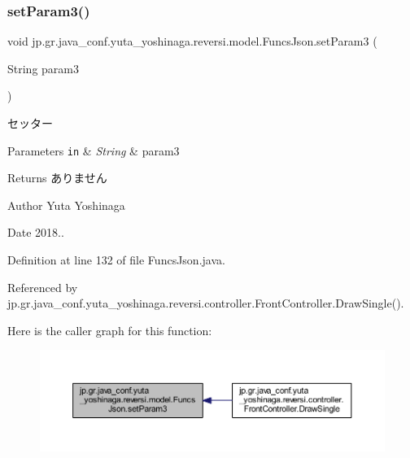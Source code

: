 \subsubsection{\texorpdfstring{set\+Param3()}{setParam3()}}
{\footnotesize\ttfamily void jp.\+gr.\+java\+\_\+conf.\+yuta\+\_\+yoshinaga.\+reversi.\+model.\+Funcs\+Json.\+set\+Param3 (\begin{DoxyParamCaption}\item[{String}]{param3 }\end{DoxyParamCaption})}



セッター 


\begin{DoxyParams}[1]{Parameters}
\mbox{\tt in}  & {\em String} & param3 \\
\hline
\end{DoxyParams}
\begin{DoxyReturn}{Returns}
ありません 
\end{DoxyReturn}
\begin{DoxyAuthor}{Author}
Yuta Yoshinaga 
\end{DoxyAuthor}
\begin{DoxyDate}{Date}
2018.. 
\end{DoxyDate}


Definition at line 132 of file Funcs\+Json.\+java.



Referenced by jp.\+gr.\+java\+\_\+conf.\+yuta\+\_\+yoshinaga.\+reversi.\+controller.\+Front\+Controller.\+Draw\+Single().

Here is the caller graph for this function\+:
\nopagebreak
\begin{figure}[H]
\begin{center}
\leavevmode
\includegraphics[width=350pt]{classjp_1_1gr_1_1java__conf_1_1yuta__yoshinaga_1_1reversi_1_1model_1_1_funcs_json_a27bc732004c573269cb63e71c1d1abcc_icgraph}
\end{center}
\end{figure}
\mbox{\label{classjp_1_1gr_1_1java__conf_1_1yuta__yoshinaga_1_1reversi_1_1model_1_1_funcs_json_a44af51970635551127a296e3c07db7ec}} 
